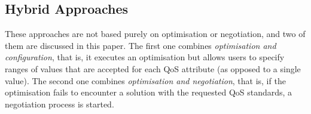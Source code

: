 \documentclass[a4paper,10pt]{article}
\begin{document}
\subsection{Hybrid Approaches}
These approaches are not based purely on optimisation or negotiation, and two of them are discussed in this paper. The first one combines
\textit{optimisation and configuration}, that is, it executes an optimisation but allows users to specify ranges of values that are accepted for
each QoS attribute (as opposed to a single value). The second one combines \textit{optimisation and negotiation}, that is, if the optimisation
fails to encounter a solution with the requested QoS standards, a negotiation process is started.



\end{document}
